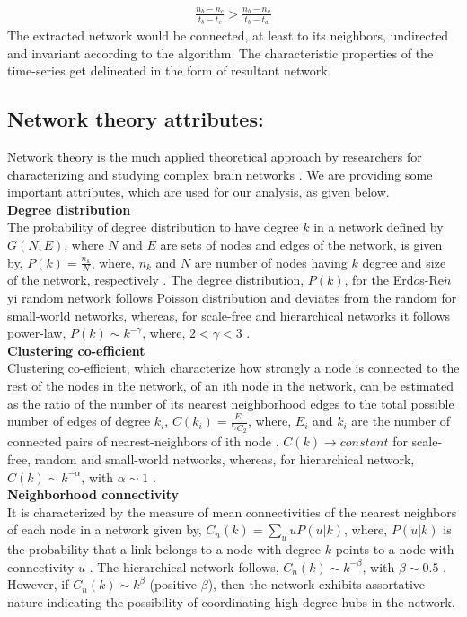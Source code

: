 \documentclass[preprintnumbers,amsmath,amssymb,onecolumn]{revtex4}
\begin{document}
\begin{eqnarray}
\frac{n_{b}-n_{c}}{t_{b}-t_{c}}>\frac{n_{b}-n_{a}}{t_{b}-t_{a}}
\end{eqnarray}
The extracted network would be connected, at least to its neighbors, undirected and invariant according to the algorithm. The characteristic properties of the time-series get delineated in the form of resultant network.

\subsection{Network theory attributes:}

{\noindent}Network theory is the much applied theoretical approach by researchers for characterizing and studying complex brain networks \citep{Sporns2002a}. We are providing some important attributes, which are used for our analysis, as given below.\\
{\noindent}\textbf{Degree distribution}\\
The probability of degree distribution to have degree $k$ in a network defined by $G(N,E)$, where $N$ and $E$ are sets of nodes and edges of the network, is given by, $P(k)=\frac{n_k}{N}$, where, $n_k$ and $N$ are number of nodes having $k$ degree and size of the network, respectively \citep{Newman2009}. {The degree distribution, $P(k)$, for the Erd$\ddot{o}$s-Re$\acute{n}$yi random network follows Poisson distribution and deviates from the random for small-world networks}, whereas, for scale-free and hierarchical networks it follows power-law, $P(k)\sim k^{-\gamma}$, where, $2<\gamma<3$ \citep{albert2002,barabasi2004}. \\ 
{\noindent}\textbf{Clustering co-efficient}\\
Clustering co-efficient, which characterize how strongly a node is connected to the rest of the nodes in the network, of an ith node in the network, can be estimated as the ratio of the number of its nearest neighborhood edges to the total possible number of edges of degree $k_i$, $C(k_i)=\frac{E_i}{^{k_i}C_2}$, where, $E_i$ and $k_i$ are the number of connected pairs of nearest-neighbors of ith node \citep{Newman2009}. $C(k)\rightarrow constant$ for scale-free, random and small-world networks, whereas, for hierarchical network, $C(k)\sim k^{-\alpha}$, with $\alpha\sim 1$ \citep{albert2002,barabasi2004}.\\
{\noindent}\textbf{Neighborhood connectivity}\\
It is characterized by the measure of mean connectivities of the nearest neighbors of each node in a network given by, $C_n(k)=\sum_{u}uP(u|k)$, where, $P(u|k)$ is the probability that a link belongs to a node with degree $k$ points to a node with connectivity $u$ \citep{maslov2002,pastor2001}. The hierarchical network follows, $C_n(k)\sim k^{-\beta}$, with $\beta\sim 0.5$ \citep{pastor2001}. However, if $C_n(k)\sim k^{\beta}$ (positive $\beta$), then the network exhibits assortative nature indicating the possibility of coordinating high degree hubs in the network.\\
\end{document}
